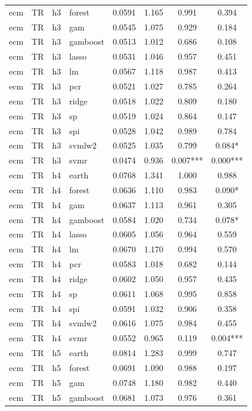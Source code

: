 \begin{ThreePartTable}
\begin{longtable}[t]{llclcccc}
ecm & TR & h3 & forest & 0.0591 & 1.165 & 0.991 & 0.394\\
ecm & TR & h3 & gam & 0.0545 & 1.075 & 0.929 & 0.184\\
ecm & TR & h3 & gamboost & 0.0513 & 1.012 & 0.686 & 0.108\\
ecm & TR & h3 & lasso & 0.0531 & 1.046 & 0.957 & 0.451\\
ecm & TR & h3 & lm & 0.0567 & 1.118 & 0.987 & 0.413\\
ecm & TR & h3 & pcr & 0.0521 & 1.027 & 0.785 & 0.264\\
ecm & TR & h3 & ridge & 0.0518 & 1.022 & 0.809 & 0.180\\
ecm & TR & h3 & sp & 0.0519 & 1.024 & 0.864 & 0.147\\
ecm & TR & h3 & spi & 0.0528 & 1.042 & 0.989 & 0.784\\
ecm & TR & h3 & svmlw2 & 0.0525 & 1.035 & 0.799 & 0.084*\\
ecm & TR & h3 & svmr & 0.0474 & 0.936 & 0.007*** & 0.000***\\
\addlinespace
ecm & TR & h4 & earth & 0.0768 & 1.341 & 1.000 & 0.988\\
ecm & TR & h4 & forest & 0.0636 & 1.110 & 0.983 & 0.090*\\
ecm & TR & h4 & gam & 0.0637 & 1.113 & 0.961 & 0.305\\
ecm & TR & h4 & gamboost & 0.0584 & 1.020 & 0.734 & 0.078*\\
ecm & TR & h4 & lasso & 0.0605 & 1.056 & 0.964 & 0.559\\
ecm & TR & h4 & lm & 0.0670 & 1.170 & 0.994 & 0.570\\
ecm & TR & h4 & pcr & 0.0583 & 1.018 & 0.682 & 0.144\\
ecm & TR & h4 & ridge & 0.0602 & 1.050 & 0.957 & 0.435\\
ecm & TR & h4 & sp & 0.0611 & 1.068 & 0.995 & 0.858\\
ecm & TR & h4 & spi & 0.0591 & 1.032 & 0.906 & 0.358\\
ecm & TR & h4 & svmlw2 & 0.0616 & 1.075 & 0.984 & 0.455\\
ecm & TR & h4 & svmr & 0.0552 & 0.965 & 0.119 & 0.004***\\
\addlinespace
ecm & TR & h5 & earth & 0.0814 & 1.283 & 0.999 & 0.747\\
ecm & TR & h5 & forest & 0.0691 & 1.090 & 0.988 & 0.197\\
ecm & TR & h5 & gam & 0.0748 & 1.180 & 0.982 & 0.440\\
ecm & TR & h5 & gamboost & 0.0681 & 1.073 & 0.976 & 0.361\\

\end{longtable}
\end{ThreePartTable}
